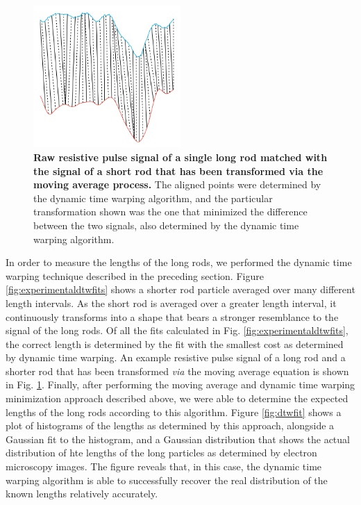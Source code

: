 			
			\begin{figure}
				\includegraphics[width=0.5\textwidth]{experimentaldtwfit.png}
				\caption{\textbf{Raw resistive pulse signal of a single long rod matched with the signal of a short rod that has been transformed via the moving average process.} The aligned points were determined by the dynamic time warping algorithm, and the particular transformation shown was the one that minimized the difference between the two signals, also determined by the dynamic time warping algorithm.}
				\label{fig:experimentaldtwfit}
			\end{figure}
			
			
			In order to measure the lengths of the long rods, we performed the dynamic time warping technique described in the preceding section. Figure \ref{fig:experimentaldtwfits} shows a shorter rod particle averaged over many different length intervals. As the short rod is averaged over a greater length interval, it continuously transforms into a shape that bears a stronger resemblance to the signal of the long rods. Of all the fits calculated in Fig. \ref{fig:experimentaldtwfits}, the correct length is determined by the fit with the smallest cost as determined by dynamic time warping. An example resistive pulse signal of a long rod and a shorter rod that has been transformed \textit{via} the moving average equation is shown in Fig. \ref{fig:experimentaldtwfit}. Finally, after performing the moving average and dynamic time warping minimization approach described above, we were able to determine the expected lengths of the long rods according to this algorithm. Figure \ref{fig:dtwfit} shows a plot of histograms of the lengths as determined by this approach, alongside a Gaussian fit to the histogram, and a Gaussian distribution that shows the actual distribution of hte lengths of the long particles as determined by electron microscopy images. The figure reveals that, in this case, the dynamic time warping algorithm is able to successfully recover the real distribution of the known lengths relatively accurately.
			
